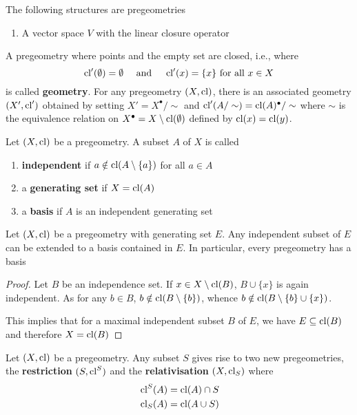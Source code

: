 \documentclass[11pt]{article}
\begin{document}
\begin{remark}
The following structures are pregeometries
\begin{enumerate}
\item A vector space \(V\) with the linear closure operator
\end{enumerate}
\end{remark}

A pregeometry where points and the empty set are closed, i.e., where
\begin{equation*}
\operatorname{\text{cl}}'(\emptyset)=\emptyset \quad\text{ and }\quad
\operatorname{\text{cl}}'(x)=\{x\}\text{ for all }x\in X
\end{equation*}
is called \textbf{geometry}. For any pregeometry \((X,\operatorname{\text{cl}})\), there is an associated
geometry \((X',\operatorname{\text{cl}}')\) obtained by setting \(X'=X^\bullet/\sim\) and \(\operatorname{\text{cl}}'(A/\sim) =\operatorname{\text{cl}}(A)^\bullet/\sim\)
where \(\sim\) is the equivalence relation on \(X^\bullet=X\setminus\operatorname{\text{cl}}(\emptyset)\) defined by \(\operatorname{\text{cl}}(x) =\operatorname{\text{cl}}(y)\).

\begin{definition}[]
Let \((X,\operatorname{\text{cl}})\) be a pregeometry. A subset \(A\) of \(X\) is called
\begin{enumerate}
\item \textbf{independent} if \(a\notin\operatorname{\text{cl}}(A\setminus\{a\})\) for all \(a\in A\)
\item a \textbf{generating set} if \(X=\operatorname{\text{cl}}(A)\)
\item a \textbf{basis} if \(A\) is an independent generating set
\end{enumerate}
\end{definition}

\begin{lemma}[]
Let \((X,\operatorname{\text{cl}})\) be a pregeometry with generating set \(E\). Any independent subset of \(E\) can
be extended to a basis contained in \(E\). In particular, every pregeometry has a basis
\end{lemma}

\begin{proof}
Let \(B\) be an independence set. If \(x\in X\setminus\operatorname{\text{cl}}(B)\), \(B\cup\{x\}\) is again independent. As for
any \(b\in B\), \(b\notin\operatorname{\text{cl}}(B\setminus\{b\})\), whence \(b\notin\operatorname{\text{cl}}(B\setminus\{b\}\cup\{x\})\).

This implies that for a maximal independent subset \(B\) of \(E\), we have \(E\subseteq\operatorname{\text{cl}}(B)\) and
therefore \(X=\operatorname{\text{cl}}(B)\)
\end{proof}

\begin{definition}[]
Let \((X,\operatorname{\text{cl}})\) be a pregeometry. Any subset \(S\) gives rise to two new pregeometries, the
\textbf{restriction} \((S,\operatorname{\text{cl}}^S)\) and the \textbf{relativisation} \((X,\operatorname{\text{cl}}_S)\) where
\begin{align*}
&\operatorname{\text{cl}}^S(A)=\operatorname{\text{cl}}(A)\cap S\\
&\operatorname{\text{cl}}_S(A)=\operatorname{\text{cl}}(A\cup S)
\end{align*}
\end{definition}
\end{document}

